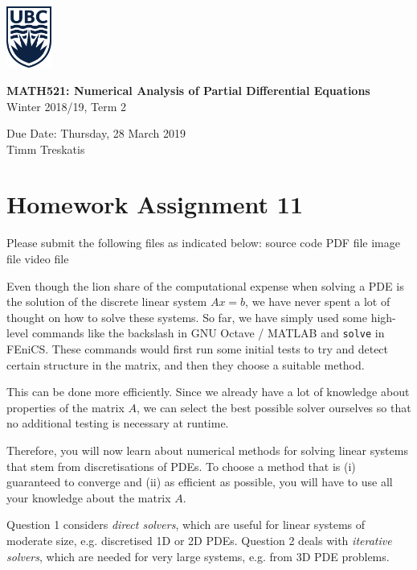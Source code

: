 \documentclass[10pt,letterpaper]{scrartcl}
\begin{document}
\begin{minipage}{.2\textwidth}
\includegraphics[width=42pt]{ubc-logo.png}
\end{minipage}
\hfill
\begin{minipage}{.75\textwidth}
\setlength{\parskip}{6pt}
\begin{flushright}
{
\sffamily
\textbf{MATH521: Numerical Analysis of Partial Differential Equations}\\
Winter 2018/19, Term 2

Due Date: Thursday, 28 March 2019\\
Timm Treskatis
}
\end{flushright}
\end{minipage}

\section*{Homework Assignment 11}

Please submit the following files as indicated below: \hfill \faFileCodeO \: source code \hfill \faFilePdfO \: PDF file \hfill \faFilePictureO \: image file \hfill \faFileMovieO \: video file

Even though the lion share of the computational expense when solving a PDE is the solution of the discrete linear system $Ax=b$, we have never spent a lot of thought on how to solve these systems. So far, we have simply used some high-level commands like the backslash in \textsf{GNU Octave} / \textsf{MATLAB} and \texttt{solve} in \textsf{FEniCS}. These commands would first run some initial tests to try and detect certain structure in the matrix, and then they choose a suitable method.

This can be done more efficiently. Since we already have a lot of knowledge about properties of the matrix $A$, we can select the best possible solver ourselves so that no additional testing is necessary at runtime.

Therefore, you will now learn about numerical methods for solving linear systems that stem from discretisations of PDEs. To choose a method that is (i) guaranteed to converge and (ii) as efficient as possible, you will have to use all your knowledge about the matrix $A$.

Question 1 considers \emph{direct solvers}, which are useful for linear systems of moderate size, e.g. discretised 1D or 2D PDEs. Question 2 deals with \emph{iterative solvers}, which are needed for very large systems, e.g. from 3D PDE problems.
\end{document}
